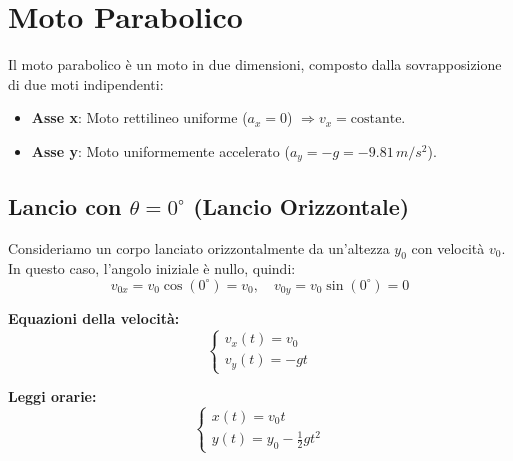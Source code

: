 \begin{center}
\end{center}

\section{Moto Parabolico}
Il moto parabolico è un moto in due dimensioni, composto dalla sovrapposizione di due moti indipendenti:
\begin{itemize}
    \item \textbf{Asse x}: Moto rettilineo uniforme ($a_x = 0$) $\Rightarrow v_x = \text{costante}$.
    \item \textbf{Asse y}: Moto uniformemente accelerato ($a_y = -g = -9.81 \, m/s^2$).
\end{itemize}

\subsection{Lancio con $\theta = 0^\circ$ (Lancio Orizzontale)}
Consideriamo un corpo lanciato orizzontalmente da un'altezza $y_0$ con velocità $v_0$.
In questo caso, l'angolo iniziale è nullo, quindi:
\begin{equation}
    v_{0x} = v_0 \cos(0^\circ) = v_0, \quad v_{0y} = v_0 \sin(0^\circ) = 0
\end{equation}

\textbf{Equazioni della velocità:}
\begin{equation}
    \begin{cases}
    v_x(t) = v_0 \\
    v_y(t) = -gt
\end{cases}
\end{equation}

\textbf{Leggi orarie:}
\begin{equation}
    \begin{cases}
    x(t) = v_0 t \\
    y(t) = y_0 - \frac{1}{2} g t^2
\end{cases}
\end{equation}

